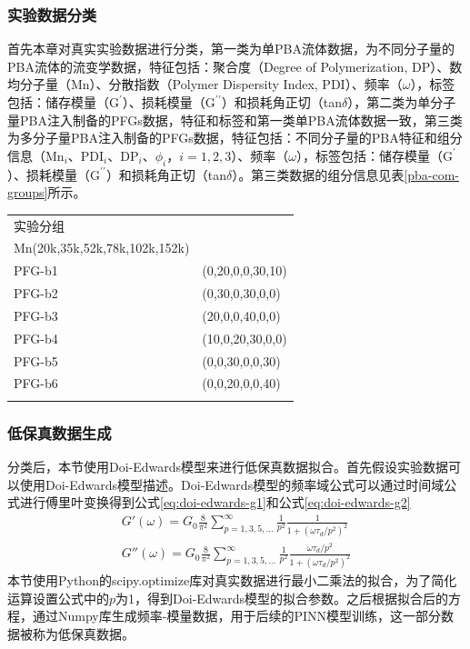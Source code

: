 \subsubsection{实验数据分类}
首先本章对真实实验数据进行分类，第一类为单PBA流体数据，为不同分子量的PBA流体的流变学数据，特征包括：聚合度（Degree of Polymerization, DP）、数均分子量（Mn）、分散指数（Polymer Dispersity Index, PDI）、频率（$\omega$），标签包括：储存模量（$\mathrm{G^{\prime}}$）、损耗模量（$\mathrm{G^{\prime\prime}}$）和损耗角正切（tan$\delta$），第二类为单分子量PBA注入制备的PFGs数据，特征和标签和第一类单PBA流体数据一致，第三类为多分子量PBA注入制备的PFGs数据，特征包括：不同分子量的PBA特征和组分信息（Mn$_i$、PDI$_i$、DP$_i$、$\phi_i$，$i=1,2,3$）、频率（$\omega$），标签包括：储存模量（$\mathrm{G^{\prime}}$）、损耗模量（$\mathrm{G^{\prime\prime}}$）和损耗角正切（tan$\delta$）。第三类数据的组分信息见表\ref{pba-com-groups}所示。
\begin{table}
  \centering
  \small
  \begin{tabularx}{\textwidth}{>{\centering\arraybackslash}X >{\centering\arraybackslash}X} %
    \Xhline{1.5pt}
    实验分组   & \makecell{
      \begin{tabular}{@{}c@{}}
        $\phi_{PBA}(\%)$ \\
        \Xhline{0.5pt}
        Mn(20k,35k,52k,78k,102k,152k)
      \end{tabular}
    }                         \\
    \Xhline{0.5pt}
    PFG-b1 & (0,20,0,0,30,10) \\
    PFG-b2 & (0,30,0,30,0,0)  \\
    PFG-b3 & (20,0,0,40,0,0)  \\
    PFG-b4 & (10,0,20,30,0,0) \\
    PFG-b5 & (0,0,30,0,0,30)  \\
    PFG-b6 & (0,0,20,0,0,40)  \\
    \Xhline{1.5pt}
  \end{tabularx}
\end{table}
\subsubsection{低保真数据生成}
分类后，本节使用Doi-Edwards模型来进行低保真数据拟合。首先假设实验数据可以使用Doi-Edwards模型描述。Doi-Edwards模型的频率域公式可以通过时间域公式进行傅里叶变换得到公式\eqref{eq:doi-edwards-g1}和公式\eqref{eq:doi-edwards-g2}
\begin{align}
  G'(\omega) = G_0 \frac{8}{\pi^2} \sum_{p=1,3,5,\ldots}^{\infty} \frac{1}{p^2} \frac{1}{1 + (\omega \tau_d / p^2)^2} \label{eq:doi-edwards-g1} \\
  G''(\omega) = G_0 \frac{8}{\pi^2} \sum_{p=1,3,5,\ldots}^{\infty} \frac{1}{p^2} \frac{\omega \tau_d / p^2}{1 + (\omega \tau_d / p^2)^2}
  \label{eq:doi-edwards-g2}
\end{align}
本节使用Python的scipy.optimize库对真实数据进行最小二乘法的拟合，为了简化运算设置公式中的$p$为1，得到Doi-Edwards模型的拟合参数。之后根据拟合后的方程，通过Numpy库生成频率-模量数据，用于后续的PINN模型训练，这一部分数据被称为低保真数据。

